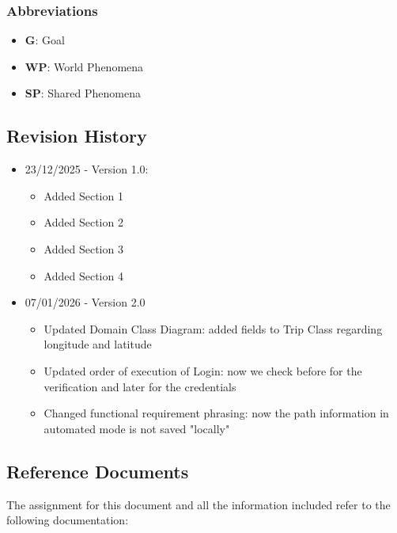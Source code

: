 \subsubsection{Abbreviations}

\begin{itemize}
    \item \textbf{G}: Goal
    \item \textbf{WP}: World Phenomena
    \item \textbf{SP}: Shared Phenomena

\end{itemize}

\subsection{Revision History}

\begin{itemize}
    \item 23/12/2025 - Version 1.0:
        \begin{itemize}[label=+]
            \item Added Section 1
            \item Added Section 2
            \item Added Section 3
            \item Added Section 4
        \end{itemize}
    \item 07/01/2026 - Version 2.0
        \begin{itemize}[label=+]
            \item Updated Domain Class Diagram: added fields to Trip Class regarding longitude and latitude
            \item Updated order of execution of Login: now we check before for the verification and later for the credentials
            \item Changed functional requirement phrasing: now the path information in automated mode is not saved "locally"
        \end{itemize}
\end{itemize}

\subsection{Reference Documents}

The assignment for this document and all the information included refer to the following documentation:

